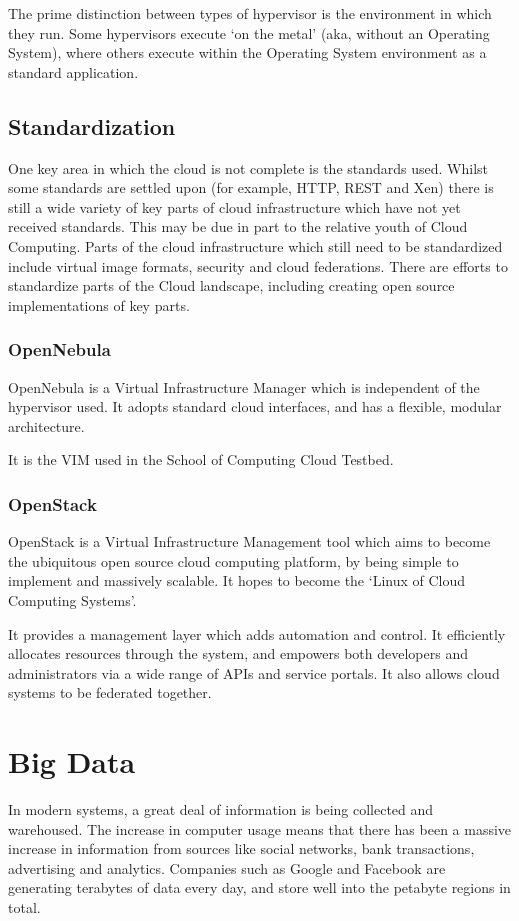 \documentclass{article}
\begin{document}
{\begin{itemize}
The prime distinction between types of hypervisor is the environment in which they run. Some hypervisors execute `on the metal' (aka, without an Operating System), where others execute within the Operating System environment as a standard application.

\subsection{Standardization}
One key area in which the cloud is not complete is the standards used. Whilst some standards are settled upon (for example, HTTP, REST and Xen) there is still a wide variety of key parts of cloud infrastructure which have not yet received standards. This may be due in part to the relative youth of Cloud Computing. Parts of the cloud infrastructure which still need to be standardized include virtual image formats, security and cloud federations. There are efforts to standardize parts of the Cloud landscape, including creating open source implementations of key parts.
 
\subsubsection{OpenNebula}
OpenNebula is a Virtual Infrastructure Manager which is independent of the hypervisor used. It adopts standard cloud interfaces, and has a flexible, modular architecture. 

It is the VIM used in the School of Computing Cloud Testbed.

\subsubsection{OpenStack}
OpenStack is a Virtual Infrastructure Management tool which aims to become the ubiquitous open source cloud computing platform, by being simple to implement and massively scalable. It hopes to become the `Linux of Cloud Computing Systems'. 

It provides a management layer which adds automation and control. It efficiently allocates resources through the system, and empowers both developers and administrators via a wide range of APIs and service portals. It also allows cloud systems to be federated together.

\section{Big Data}
In modern systems, a great deal of information is being collected and warehoused. The increase in computer usage means that there has been a massive increase in information from sources like social networks, bank transactions, advertising and analytics. Companies such as Google and Facebook are generating terabytes of data every day, and store well into the petabyte regions in total.


\end{itemize}}
\end{document}
